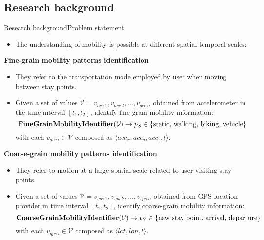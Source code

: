 \subsection{Research background}
\begin{frame}{Research background}{Problem statement}
\small
\vspace{-0.5cm}
\begin{itemize}
  \item The understanding of mobility is possible at different spatial-temporal scales:
\end{itemize}

\begin{exampleblock}{\small \textbf{Fine-grain mobility patterns identification}}
 \begin{itemize}
    \item They refer to the transportation mode employed by user when moving between stay points.
    \item Given a set of values $\mathcal{V} = v_{acc~1},v_{acc~2},\ldots,v_{acc~n}$ obtained from accelerometer in the time interval $[t_1,t_2]$, identify fine-grain mobility information:
\begin{equation*}
  \text{\textbf{FineGrainMobilityIdentifier}}(\mathcal{V}) \rightarrow p_S \in \{ \text{static, walking, biking, vehicle} \}
\end{equation*}
with each $v_{acc~i} \in \mathcal{V}$ composed as $\langle acc_x,acc_y,acc_z,t \rangle$.
  \end{itemize} 
\end{exampleblock}

\begin{exampleblock}{\small \textbf{Coarse-grain mobility patterns identification}}
 \begin{itemize}
   \item They refer to motion at a large spatial scale related to user visiting stay points.
   \item \sloppy Given a set of values $\mathcal{V} = v_{gps~1},v_{gps~2},\ldots,v_{gps~n}$ obtained from GPS location provider in time interval $[t_1,t_2]$, identify coarse-grain mobility information:
\begin{equation*}
    \text{\textbf{CoarseGrainMobilityIdentifier}}(\mathcal{V}) \rightarrow p_S \in \{ \text{new stay point, arrival, departure} \}
\end{equation*}
with each $v_{gps~i} \in \mathcal{V}$ composed as $\langle lat, lon, t \rangle$.
 \end{itemize}
\end{exampleblock}
\end{frame}



